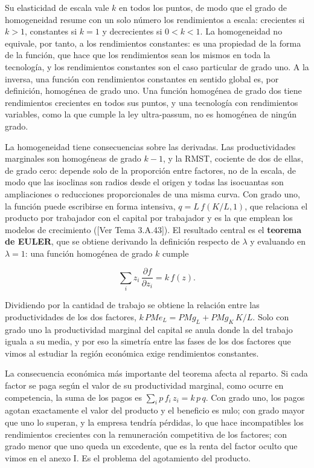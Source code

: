 \documentclass[10pt,a4paper]{article}
\newcommand{\authorfont}[1]{{\fontfamily{EBGaramond-TLF}\selectfont #1}}
\newcounter{anexo}
\begin{document}
Su elasticidad de escala vale $k$ en todos los puntos, de modo que el grado de homogeneidad resume con un solo número los rendimientos a escala: crecientes si $k>1$, constantes si $k=1$ y decrecientes si $0<k<1$. La homogeneidad no equivale, por tanto, a los rendimientos constantes: es una propiedad de la forma de la función, que hace que los rendimientos sean los mismos en toda la tecnología, y los rendimientos constantes son el caso particular de grado uno. A la inversa, una función con rendimientos constantes en sentido global es, por definición, homogénea de grado uno. Una función homogénea de grado dos tiene rendimientos crecientes en todos sus puntos, y una tecnología con rendimientos variables, como la que cumple la ley ultra-passum, no es homogénea de ningún grado.

La homogeneidad tiene consecuencias sobre las derivadas. Las productividades marginales son homogéneas de grado $k-1$, y la RMST, cociente de dos de ellas, de grado cero: depende solo de la proporción entre factores, no de la escala, de modo que las isoclinas son radios desde el origen y todas las isocuantas son ampliaciones o reducciones proporcionales de una misma curva. Con grado uno, la función puede escribirse en forma intensiva, $q=L\,f(K/L,1)$, que relaciona el producto por trabajador con el capital por trabajador y es la que emplean los modelos de crecimiento ([\authorfont{Ver Tema 3.A.43}]). El resultado central es el \textbf{teorema de EULER}, que se obtiene derivando la definición respecto de $\lambda$ y evaluando en $\lambda=1$: una función homogénea de grado $k$ cumple

$$\sum_i z_i\,\frac{\partial f}{\partial z_i}=k\,f(z).$$

Dividiendo por la cantidad de trabajo se obtiene la relación entre las productividades de los dos factores, $k\,PMe_L=PMg_L+PMg_K\,K/L$. Solo con grado uno la productividad marginal del capital se anula donde la del trabajo iguala a su media, y por eso la simetría entre las fases de los dos factores que vimos al estudiar la región económica exige rendimientos constantes.

La consecuencia económica más importante del teorema afecta al reparto. Si cada factor se paga según el valor de su productividad marginal, como ocurre en competencia, la suma de los pagos es $\sum_i p\,f_i\,z_i=k\,p\,q$. Con grado uno, los pagos agotan exactamente el valor del producto y el beneficio es nulo; con grado mayor que uno lo superan, y la empresa tendría pérdidas, lo que hace incompatibles los rendimientos crecientes con la remuneración competitiva de los factores; con grado menor que uno queda un excedente, que es la renta del factor oculto que vimos en el anexo I. Es el problema del agotamiento del producto.
\end{document}
